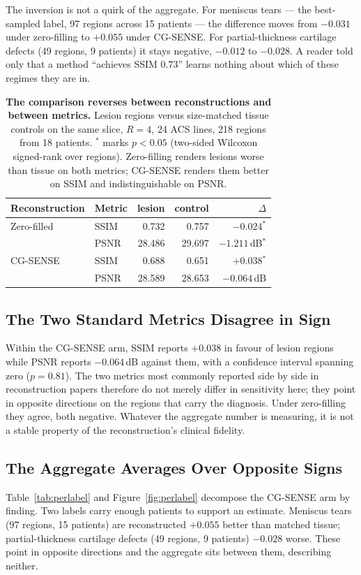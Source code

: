 \documentclass[letterpaper]{article} %
\begin{document}
The inversion is not a quirk of the aggregate. For meniscus tears --- the
best-sampled label, 97 regions across 15 patients --- the difference moves from
$-0.031$ under zero-filling to $+0.055$ under CG-SENSE. For partial-thickness
cartilage defects (49 regions, 9 patients) it stays negative, $-0.012$ to
$-0.028$. A reader told only that a method ``achieves SSIM $0.73$'' learns
nothing about which of these regimes they are in.

\begin{table}[t]
\centering
\small
\begin{tabular}{llrrr}
\toprule
Reconstruction & Metric & lesion & control & $\Delta$ \\
\midrule
Zero-filled & SSIM & 0.732 & 0.757 & $-0.024$$^{*}$ \\
 & PSNR & 28.486 & 29.697 & $-1.211$\,dB$^{*}$ \\
CG-SENSE & SSIM & 0.688 & 0.651 & $+0.038$$^{*}$ \\
 & PSNR & 28.589 & 28.653 & $-0.064$\,dB \\
\bottomrule
\end{tabular}
\caption{\textbf{The comparison reverses between reconstructions and between
metrics.} Lesion regions versus size-matched tissue controls on the same slice,
$R{=}4$, 24 ACS lines, 218 regions from 18 patients. $^{*}$ marks $p<0.05$
(two-sided Wilcoxon signed-rank over regions). Zero-filling renders lesions
worse than tissue on both metrics; CG-SENSE renders them better on SSIM and
indistinguishable on PSNR.}
\label{tab:arms}
\end{table}

\subsection{The Two Standard Metrics Disagree in Sign}
Within the CG-SENSE arm, SSIM reports $+0.038$ in favour of lesion regions while
PSNR reports $-0.064$\,dB against them, with a confidence interval spanning zero
($p{=}0.81$). The two metrics most commonly reported side by side in
reconstruction papers therefore do not merely differ in sensitivity here; they
point in opposite directions on the regions that carry the diagnosis. Under
zero-filling they agree, both negative. Whatever the aggregate number is
measuring, it is not a stable property of the reconstruction's clinical
fidelity.

\subsection{The Aggregate Averages Over Opposite Signs}
Table~\ref{tab:perlabel} and Figure~\ref{fig:perlabel} decompose the CG-SENSE
arm by finding. Two labels carry enough patients to support an estimate.
Meniscus tears (97 regions, 15 patients) are reconstructed $+0.055$ better than
matched tissue; partial-thickness cartilage defects (49 regions, 9 patients)
$-0.028$ worse. These point in opposite directions and the aggregate sits
between them, describing neither.
\end{document}
